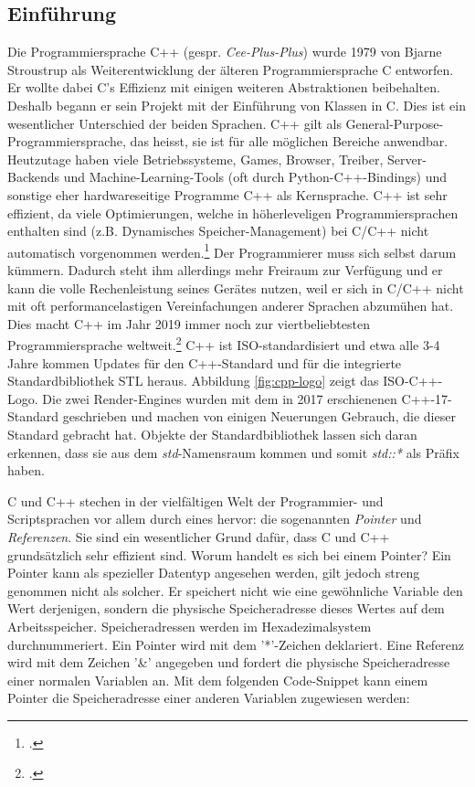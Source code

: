 \documentclass[titlepage, 11pt, a4paper, ngerman]{article}
\begin{document}
\subsection{Einführung}
Die Programmiersprache C++ (gespr. \textit{Cee-Plus-Plus}) wurde 1979 von Bjarne Stroustrup als Weiterentwicklung der älteren Programmiersprache C entworfen. Er wollte dabei C's Effizienz mit einigen weiteren Abstraktionen beibehalten. Deshalb begann er sein Projekt mit der Einführung von Klassen in C. Dies ist ein wesentlicher Unterschied der beiden Sprachen. C++ gilt als General-Purpose-Programmiersprache, das heisst, sie ist für alle möglichen Bereiche anwendbar. Heutzutage haben viele Betriebssysteme, Games, Browser, Treiber, Server-Backends und Machine-Learning-\glspl{Tool} (oft durch Python-C++-Bindings) und sonstige eher hardwareseitige Programme C++ als Kernsprache. C++ ist sehr effizient, da viele Optimierungen, welche in höherleveligen Programmiersprachen enthalten sind (z.B. Dynamisches Speicher-Management) bei C/C++ nicht automatisch vorgenommen werden.\footcite{cpp-language} Der Programmierer muss sich selbst darum kümmern. Dadurch steht ihm allerdings mehr Freiraum zur Verfügung und er kann die volle Rechenleistung seines Gerätes nutzen, weil er sich in C/C++ nicht mit oft performancelastigen Vereinfachungen anderer Sprachen abzumühen hat. Dies macht C++ im Jahr 2019 immer noch zur viertbeliebtesten Programmiersprache weltweit.\footcite{tiobe} C++ ist ISO-standardisiert und etwa alle 3-4 Jahre kommen Updates für den C++-Standard und für die integrierte Standardbibliothek STL heraus. Abbildung \ref{fig:cpp-logo} zeigt das ISO-C++-Logo. Die zwei Render-\glspl{Engine} wurden mit dem in 2017 erschienenen C++-17-Standard geschrieben und machen von einigen Neuerungen Gebrauch, die dieser Standard gebracht hat. Objekte der Standardbibliothek lassen sich daran erkennen, dass sie aus dem \textit{std}-Namensraum kommen und somit \textit{std::*} als Präfix haben.\par
C und C++ stechen in der vielfältigen Welt der Programmier- und Scriptsprachen vor allem durch eines hervor: die sogenannten \textit{Pointer} und \textit{Referenzen}. Sie sind ein wesentlicher Grund dafür, dass C und C++ grundsätzlich sehr effizient sind. Worum handelt es sich bei einem Pointer? Ein Pointer kann als spezieller Datentyp angesehen werden, gilt jedoch streng genommen nicht als solcher. Er speichert nicht wie eine gewöhnliche Variable den Wert derjenigen, sondern die physische Speicheradresse dieses Wertes auf dem Arbeitsspeicher. Speicheradressen werden im Hexadezimalsystem durchnummeriert. Ein Pointer wird mit dem '*'-Zeichen deklariert. Eine Referenz wird mit dem Zeichen '\&' angegeben und fordert die physische Speicheradresse einer normalen Variablen an. Mit dem folgenden Code-Snippet kann einem Pointer die Speicheradresse einer anderen Variablen zugewiesen werden:
\end{document}
